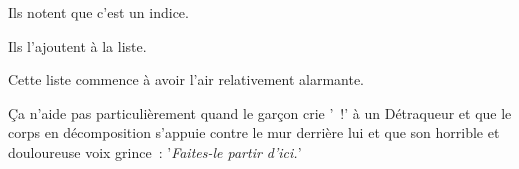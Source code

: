 Ils notent que c'est un indice.

Ils l'ajoutent à la liste.

Cette liste commence à avoir l'air relativement alarmante.

Ça n'aide pas particulièrement quand le garçon crie '~!' à un Détraqueur et que le corps en décomposition s'appuie contre le mur derrière lui et que son horrible et douloureuse voix grince~: '\emph{Faites-le partir d'ici.}' 

